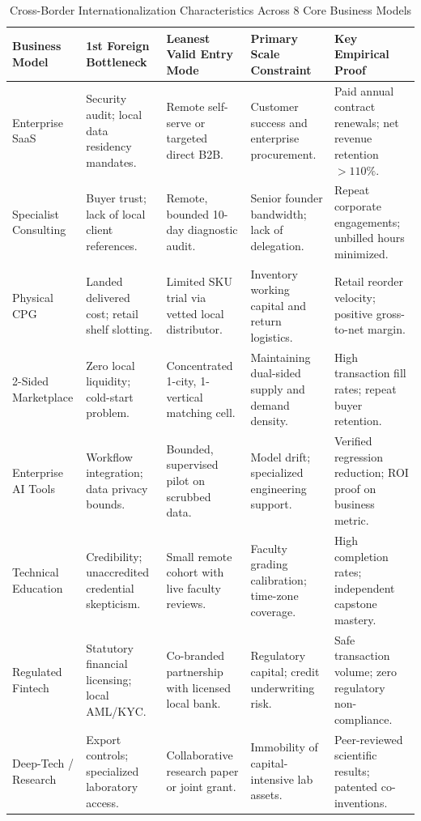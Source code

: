 \begin{table}[t]
\centering
\small
\caption{Cross-Border Internationalization Characteristics Across 8 Core Business Models}
\label{tab:business_model_comparison}
\begin{tabularx}{\textwidth}{p{2.8cm} p{3.2cm} p{3.2cm} p{3.2cm} X}
\toprule
\textbf{Business Model} & \textbf{1st Foreign Bottleneck} & \textbf{Leanest Valid Entry Mode} & \textbf{Primary Scale Constraint} & \textbf{Key Empirical Proof} \\
\midrule
Enterprise SaaS & Security audit; local data residency mandates. & Remote self-serve or targeted direct B2B. & Customer success and enterprise procurement. & Paid annual contract renewals; net revenue retention $>110\%$. \\
Specialist Consulting & Buyer trust; lack of local client references. & Remote, bounded 10-day diagnostic audit. & Senior founder bandwidth; lack of delegation. & Repeat corporate engagements; unbilled hours minimized. \\
Physical CPG & Landed delivered cost; retail shelf slotting. & Limited SKU trial via vetted local distributor. & Inventory working capital and return logistics. & Retail reorder velocity; positive gross-to-net margin. \\
2-Sided Marketplace & Zero local liquidity; cold-start problem. & Concentrated 1-city, 1-vertical matching cell. & Maintaining dual-sided supply and demand density. & High transaction fill rates; repeat buyer retention. \\
Enterprise AI Tools & Workflow integration; data privacy bounds. & Bounded, supervised pilot on scrubbed data. & Model drift; specialized engineering support. & Verified regression reduction; ROI proof on business metric. \\
Technical Education & Credibility; unaccredited credential skepticism. & Small remote cohort with live faculty reviews. & Faculty grading calibration; time-zone coverage. & High completion rates; independent capstone mastery. \\
Regulated Fintech & Statutory financial licensing; local AML/KYC. & Co-branded partnership with licensed local bank. & Regulatory capital; credit underwriting risk. & Safe transaction volume; zero regulatory non-compliance. \\
Deep-Tech / Research & Export controls; specialized laboratory access. & Collaborative research paper or joint grant. & Immobility of capital-intensive lab assets. & Peer-reviewed scientific results; patented co-inventions. \\
\bottomrule
\end{tabularx}
\end{table}
